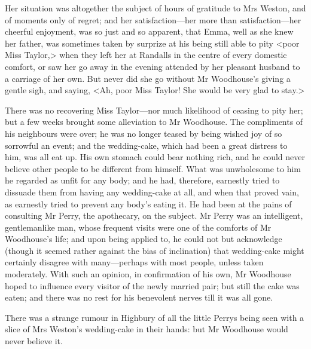 Her situation was altogether the subject of hours of gratitude to Mrs Weston, and of moments only of regret; and her satisfaction—her more than satisfaction—her cheerful enjoyment, was so just and so apparent, that Emma, well as she knew her father, was sometimes taken by surprize at his being still able to pity <poor Miss Taylor,> when they left her at Randalls in the centre of every domestic comfort, or saw her go away in the evening attended by her pleasant husband to a carriage of her own. But never did she go without Mr Woodhouse's giving a gentle sigh, and saying, <Ah, poor Miss Taylor! She would be very glad to stay.>

There was no recovering Miss Taylor—nor much likelihood of ceasing to pity her; but a few weeks brought some alleviation to Mr Woodhouse. The compliments of his neighbours were over; he was no longer teased by being wished joy of so sorrowful an event; and the wedding-cake, which had been a great distress to him, was all eat up. His own stomach could bear nothing rich, and he could never believe other people to be different from himself. What was unwholesome to him he regarded as unfit for any body; and he had, therefore, earnestly tried to dissuade them from having any wedding-cake at all, and when that proved vain, as earnestly tried to prevent any body's eating it. He had been at the pains of consulting Mr Perry, the apothecary, on the subject. Mr Perry was an intelligent, gentlemanlike man, whose frequent visits were one of the comforts of Mr Woodhouse's life; and upon being applied to, he could not but acknowledge (though it seemed rather against the bias of inclination) that wedding-cake might certainly disagree with many—perhaps with most people, unless taken moderately. With such an opinion, in confirmation of his own, Mr Woodhouse hoped to influence every visitor of the newly married pair; but still the cake was eaten; and there was no rest for his benevolent nerves till it was all gone.




There was a strange rumour in Highbury of all the little Perrys being seen with a slice of Mrs Weston's wedding-cake in their hands: but Mr Woodhouse would never believe it.